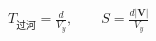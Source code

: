 \documentclass[border=2.5pt]{standalone}
\begin{document}
$\displaystyle T_{\text{过河}}=\frac d{V_y},\qquad S=\frac{d|\bm V|}{V_y}$
\end{document}

